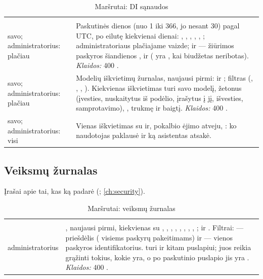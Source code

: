 \begin{xltabular}{\textwidth}{@{}L{19mm}Y@{}}
\caption{Maršrutai: DI sąnaudos}\label{tab:api:usage}\\
\toprule {} &  \\ \midrule \endfirsthead
\toprule {} &  \\ \midrule \endhead
\bottomrule \endlastfoot
{}
savo; administratorius: plačiau & Paskutinės  dienos (nuo 1 iki 366, jo nesant 30)
  pagal UTC, po eilutę kiekvienai dienai: , , ,
  , , ;  administratoriaus plačiajame vaizde; ir
   --- žiūrimos paskyros šiandienos ,  ir 
  ( yra , kai biudžetas neribotas). \emph{Klaidos:} 400
  . \\
\addlinespace
{}
savo; administratorius: plačiau & Modelių iškvietimų žurnalas, naujausi pirmi:  ir
  ; filtras  (, , ,
  ). Kiekvienas iškvietimas turi savo modelį, žetonus (įvesties, nuskaitytus
  iš podėlio, įrašytus į jį, išvesties, samprotavimo), , trukmę ir baigtį.
  \emph{Klaidos:} 400 . \\
\addlinespace
{}
savo; administratorius: visi & Vienas iškvietimas su  ir, pokalbio ėjimo atveju,
  : ko naudotojas paklausė ir ką asistentas atsakė. \\
\end{xltabular}

\subsection{Veiksmų žurnalas}\label{sec:api:audit}

Įrašai apie tai, kas ką padarė (; \cref{ch:security}).

\begin{xltabular}{\textwidth}{@{}L{19mm}Y@{}}
\caption{Maršrutai: veiksmų žurnalas}\label{tab:api:audit}\\
\toprule {} &  \\ \midrule \endfirsthead
\toprule {} &  \\ \midrule \endhead
\bottomrule \endlastfoot
{}
administratorius & , naujausi pirmi, kiekvienas su , ,
  , , , , , ,
  ; ir . Filtrai:  --- priešdėlis ( visiems
  paskyrų pakeitimams) ir  --- vienos paskyros identifikatorius.  turi
   ir  kitam puslapiui; juos reikia grąžinti tokius, kokie yra, o po
  paskutinio puslapio jis yra . \emph{Klaidos:} 400 . \\
\end{xltabular}


